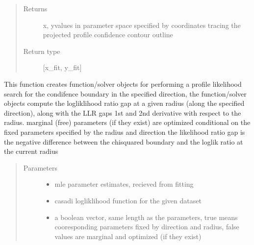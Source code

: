 \documentclass[letterpaper,10pt,english,openany,oneside]{sphinxmanual}
\begin{document}
\begin{fulllineitems}
\begin{fulllineitems}
\begin{quote}
\begin{description}
\begin{itemize}
\end{itemize}

\item[{Returns}] \leavevmode
x, y\sphinxhyphen{}values in parameter space specified by coordinates tracing the projected profile confidence contour outline

\item[{Return type}] \leavevmode
{[}x\_fit, y\_fit{]}

\end{description}\end{quote}

\end{fulllineitems}


\begin{fulllineitems}
\label{\detokenize{nloed:nloed.model.Model.__profilesetup}}
This function creates function/solver objects for performing a profile likelihood search for the condifence boundary
in the specified direction,  the function/solver objects compute the logliklihood ratio gap
at a given radius (along the specified direction),  along with the LLR gaps 1st and 2nd derivative with respect to the radius.
marginal (free) parameters (if they exist) are optimized conditional on the fixed parameters specified by the radius and direction
the likelihood ratio gap is the negative difference between the chi\sphinxhyphen{}squared boundary and the loglik ratio at the current radius
\begin{quote}\begin{description}
\item[{Parameters}] \leavevmode\begin{itemize}
\item {} 
 \textendash{} mle parameter estimates,  recieved from fitting

\item {} 
 \textendash{} casadi logliklihood function for the given dataset

\item {} 
 \textendash{} a boolean vector,  same length as the parameters,  true means cooresponding parameters fixed by direction and radius,  false values are marginal and optimized (if they exist)


\end{itemize}
\end{description}
\end{quote}
\end{fulllineitems}
\end{fulllineitems}
\end{document}
